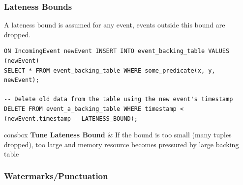 \subsubsection{Lateness Bounds}
A lateness bound is assumed for any event, events outside this bound are dropped.
\begin{verbatim}
ON IncomingEvent newEvent INSERT INTO event_backing_table VALUES (newEvent)
SELECT * FROM event_backing_table WHERE some_predicate(x, y, newEvent);

-- Delete old data from the table using the new event's timestamp
DELETE FROM event_a_backing_table WHERE timestamp < (newEvent.timestamp - LATENESS_BOUND);
\end{verbatim}
\begin{tabbox}[.7\textwidth]{consbox}
    \textbf{Tune Lateness Bound} & If the bound is too small (many tuples dropped), too large and memory resource becomes pressured by large backing table \\
\end{tabbox}

\subsubsection{Watermarks/Punctuation}
\unfinished

